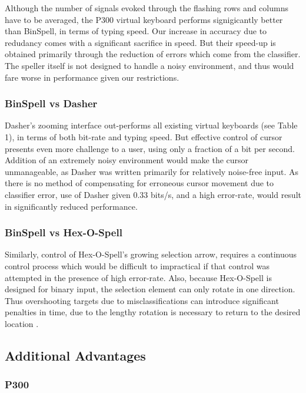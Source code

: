 \documentclass[12pt,titlepage]{article}
\begin{document}
Although the number of signals evoked through the flashing rows and columns have to be averaged, the P300 virtual keyboard performs signigicantly better than BinSpell, in terms of typing speed.  Our increase in accuracy due to redudancy comes with a significant sacrifice in speed.  But their speed-up is obtained primarily through the reduction of errors which come from the classifier.  The speller itself is not designed to handle a noisy environment, and thus would fare worse in performance given our restrictions.

\subsubsection{BinSpell vs Dasher}

Dasher's zooming interface out-performs all existing virtual keyboards (see Table 1), in terms of both bit-rate and typing speed.  But effective control of cursor presents even more challenge to a user, using only a fraction of a bit per second.  Addition of an extremely 
noisy environment would make the cursor unmanageable, as Dasher was written primarily for relatively noise-free input. As there is no method of compensating for erroneous cursor movement due to classifier error, use of Dasher given $0.33$ bits/s, and a high error-rate, would result in significantly reduced performance.

\subsubsection{BinSpell vs Hex-O-Spell}

Similarly, control of Hex-O-Spell's growing selection arrow, requires a continuous control process which would be difficult to impractical if that control was attempted in the presence of high error-rate.  Also, 
because Hex-O-Spell is designed for binary input, the selection element 
can only rotate in one direction.  Thus overshooting targets due to misclassifications can introduce significant penalties 
in time, due to the  lengthy rotation is necessary to return to the desired location \cite{blankertz_advanced}.  


\subsection{Additional Advantages}

\subsubsection{P300}
\end{document}
